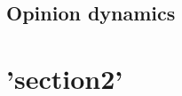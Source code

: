 \documentclass{article}
\begin{document}

\subsection{Opinion dynamics}


\section{'section2'}
\label{sec2}
\end{document}
